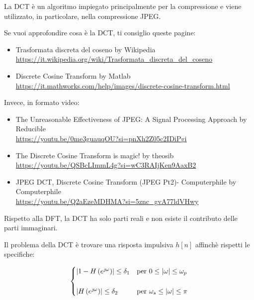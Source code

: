 \begin{tcolorbox}
    La DCT è un algoritmo impiegato principalmente per la compressione e viene utilizzato, in particolare, nella compressione JPEG. \newline 

    Se vuoi approfondire cosa è la DCT, ti consiglio queste pagine: 
    
    \begin{itemize}
        \item Trasformata discreta del coseno by Wikipedia \\\url{https://it.wikipedia.org/wiki/Trasformata_discreta_del_coseno} 
        \item Discrete Cosine Transform by Matlab\\\url{https://it.mathworks.com/help/images/discrete-cosine-transform.html}
    \end{itemize}    

    Invece, in formato video: 

    \begin{itemize}
        \item The Unreasonable Effectiveness of JPEG: A Signal Processing Approach by Reducible \\\url{https://youtu.be/0me3guauqOU?si=pnXh2Z05c2IDiPgi} 
        \item The Discrete Cosine Transform is magic! by theosib \\\url{https://youtu.be/QSBcLImmL4g?si=wC3RAIjKen9AaxB2} 
        \item JPEG DCT, Discrete Cosine Transform (JPEG Pt2)- Computerphile by Computerphile \\ \url{https://youtu.be/Q2aEzeMDHMA?si=5znc_gvA77ldVHwy}
    \end{itemize}
\end{tcolorbox}

Rispetto alla DFT, la DCT ha solo parti reali e non esiste il contributo delle parti immaginari. \newline 

Il problema della DCT è trovare una risposta impulsiva $h \left[ n\right]$ affinchè rispetti le specifiche: 

{
    \Large 
    \begin{equation}
        \begin{cases}
            \abs{1 - H \left(e^{\jmath \omega}\right)} \leq \delta_1 
            &\text{per } 
            0 \leq \abs{\omega} \leq \omega_p 
            \\
            \quad
            \\
            \abs{H \left(e^{\jmath \omega}\right)} \leq \delta_2 
            &\text{per } 
            \omega_s \leq \abs{\omega} \leq \pi 
        \end{cases}
    \end{equation}
}

